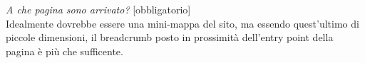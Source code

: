 \textit{A che pagina sono arrivato?} [obbligatorio]\\
Idealmente dovrebbe essere una mini-mappa del sito, ma essendo quest'ultimo di piccole dimensioni, il breadcrumb posto in prossimità dell'entry point della pagina è più che sufficente.